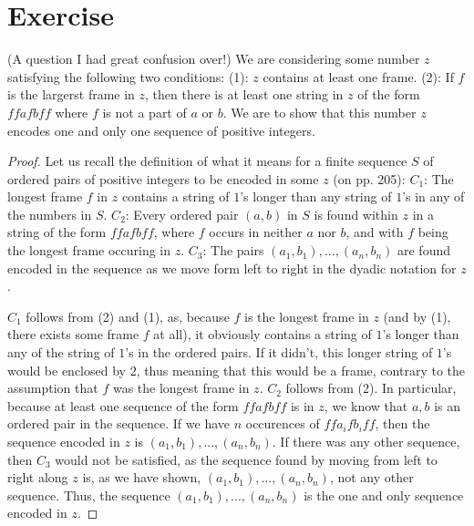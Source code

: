 \documentclass{article}
\theoremstyle{definition}
\begin{document}
\section*{Exercise}
(A question I had great confusion over!)\newline
We are considering some number $z$ satisfying the following two conditions:\newline
(1): $z$ contains at least one frame.\newline
(2): If $f$ is the largerst frame in $z$, then there is at least one string in $z$ of the form $ffafbff$ where $f$ is not a part of $a$ or $b$.\newline
We are to show that this number $z$ encodes one and only one sequence of positive integers.
\begin{proof}
Let us recall the definition of what it means for a finite sequence $S$ of ordered pairs of positive integers to be encoded in some $z$ (on pp. 205):\newline
$C_1$: The longest frame $f$ in $z$ contains a string of $1$'s longer than any string of $1$'s in any of the numbers in $S$.\newline
$C_2$: Every ordered pair $(a,b)$ in $S$ is found within $z$ in a string of the form $ffafbff$, where $f$ occurs in neither $a$ nor $b$, and with $f$ being 
the longest frame occuring in $z$.\newline
$C_3$: The pairs $(a_1,b_1),...,(a_n,b_n)$ are found encoded in the sequence as we move form left to right in the dyadic notation for $z$.


$C_1$ follows from (2) and (1), as, because $f$ is the longest frame in $z$ (and by (1), there exists some frame $f$ at all), 
it obviously contains a string of $1$'s longer than any of the string of $1$'s 
in the ordered pairs. If it didn't, this longer string of $1$'s would be enclosed by $2$, thus meaning that this would be a frame, contrary to the assumption 
that $f$ was the longest frame in $z$. $C_2$ follows from (2). In particular, because at least one sequence of the form $ffafbff$ is in $z$, we know that 
$a,b$ is an ordered pair in the sequence. If we have $n$ occurences of $ffa_ifb_iff$, then the sequence encoded in $z$ is $(a_1,b_1),...,(a_n,b_n)$. 
If there was any other sequence, then $C_3$ would not be satisfied, as the sequence found by moving from left to right along $z$ is, as we have shown,  
$(a_1,b_1),...,(a_n,b_n)$, not any other sequence. Thus, the sequence $(a_1,b_1),...,(a_n,b_n)$ is the one and only sequence encoded in $z$.
\end{proof}
\end{document}

